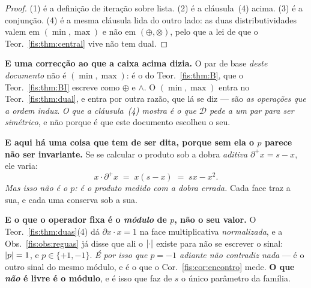 \documentclass[livro.tex]{subfiles}
\begin{document}
\begin{proof}
(1) é a definição de iteração sobre lista. (2) é a cláusula~(4) acima. (3) é a
conjunção. (4) é a mesma cláusula lida do outro lado: as duas distributividades
valem em $(\min,\max)$ e não em $(\oplus,\otimes)$, pelo que a lei de que o
Teor.~\ref{fis:thm:central} vive não tem dual.
\end{proof}

\medskip\noindent\textbf{E uma correcção ao que a caixa acima dizia.} O par de
base \emph{deste documento} não é $(\min,\max)$: é o do Teor.~\ref{fis:thm:B},
que o Teor.~\ref{fis:thm:BI} escreve como $\oplus$ e $\wedge$. O $(\min,\max)$
entra no Teor.~\ref{fis:thm:dual}, e entra por outra razão, que lá se diz --- são
\emph{as operações que a ordem induz}. \emph{O que a cláusula~(4) mostra é o que
$\mathcal{D}$ pede a um par para ser simétrico}, e não porque é que este
documento escolheu o seu.

\medskip\noindent\textbf{E aqui há uma coisa que tem de ser dita, porque sem ela
o $p$ parece não ser invariante.} Se se calcular o produto sob a dobra
\emph{aditiva} $\partial^{+}x=s-x$, ele varia:
\[
x\cdot\partial^{+}x \;=\; x(s-x) \;=\; sx-x^{2}.
\]
\emph{Mas isso não é o $p$: é o produto medido com a dobra errada.} Cada face traz
a sua, e cada uma conserva sob a sua.

\smallskip\noindent\textbf{E o que o operador fixa é o \emph{módulo} de $p$, não
o seu valor.} O Teor.~\ref{fis:thm:duas}(4) dá $\partial x\cdot x=1$ na face
multiplicativa \emph{normalizada}, e a Obs.~\ref{fis:obs:reguas} já disse que ali
o $\lvert \cdot\rvert$ existe para não se escrever o sinal: $\lvert p\rvert=1$, e
$p\in\{+1,-1\}$. \emph{É por isso que $p=-1$ adiante não contradiz nada} --- é o
outro sinal do mesmo módulo, e é o que o Cor.~\ref{fis:cor:encontro} mede.
\textbf{O que \emph{não} é livre é o módulo}, e é isso que faz de $s$ o único
parâmetro da família.
\end{document}
